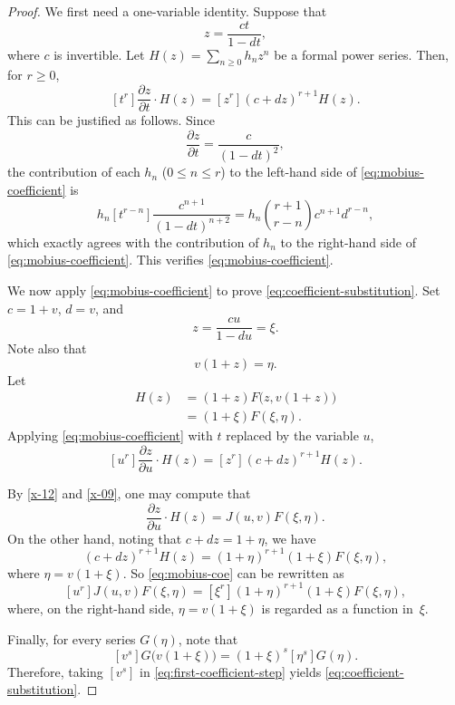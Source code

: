 \documentclass[10pt,a4paper]{amsart}
\begin{document}
\begin{proof}
We first need  a one-variable identity.  Suppose that
\[
 z=\frac{ct}{1-dt}, 
\]
where $c$ is invertible.  Let $H(z)=\sum_{n\geq0}h_nz^n$ be a formal power series.  Then, for
$r\geq0$,
\begin{equation}\label{eq:mobius-coefficient}
 [t^r]\frac{\partial z}{\partial t}\cdot H(z)
 =[z^r](c+dz)^{r+1}H(z).
\end{equation}
This can be justified as follows.  Since
\[
 \frac{\partial z}{\partial t}=\frac{c}{(1-dt)^2},
\]
the contribution of each $h_n$ ($0\leq n\leq r$) to the left-hand side of \eqref{eq:mobius-coefficient} is
\[
 h_n[t^{r-n}]\frac{c^{n+1}}{(1-dt)^{n+2}}
 =h_n\binom{r+1}{r-n}c^{n+1}d^{r-n},
\]
which exactly agrees with the  contribution of $h_n$ to the right-hand side  of \eqref{eq:mobius-coefficient}. 
This verifies \eqref{eq:mobius-coefficient}. 

We now apply \eqref{eq:mobius-coefficient} to prove \eqref{eq:coefficient-substitution}.
Set  $c=1+v$, $d=v$, and 
\begin{equation}\label{x-12}
     z=\frac{cu}{1-du}=\xi.
\end{equation}
Note also that 
\[
v(1+z)=\eta.
\] 
Let 
\begin{align}
     H(z)&=(1+z)F\bigl(z,v(1+z)\bigr)\nonumber\\
     &=(1+\xi)F(\xi, \eta).\label{x-09}
\end{align}
Applying 
\eqref{eq:mobius-coefficient} with $t$ replaced by the variable $u$,
\begin{equation}\label{eq:mobius-coe}
 [u^r]\frac{\partial z}{\partial u}\cdot H(z)
 =[z^r](c+dz)^{r+1}H(z).
\end{equation}

By \eqref{x-12} and \eqref{x-09}, one may compute that 
\begin{equation*}
  \frac{\partial z}{\partial u}\cdot H(z)=J(u,v) F(\xi,\eta).  
\end{equation*}
On the other hand, noting that 
  $c+dz=1+\eta$, we have
\begin{equation*}
    (c+dz)^{r+1}H(z)=(1+\eta)^{r+1}(1+\xi)F(\xi,\eta),
\end{equation*}  
{where $\eta=v(1+\xi)$}. 
So \eqref{eq:mobius-coe} can be rewritten as 
\begin{equation}\label{eq:first-coefficient-step}
 [u^r]J(u,v)F(\xi,\eta)
 =[\xi^r](1+\eta)^{r+1}(1+\xi)F(\xi,\eta),
\end{equation}
where, on the right-hand side,  $\eta=v(1+\xi)$ is regarded as a function in~$\xi$. 


Finally, for every series $G(\eta)$, note that 
\[
 [v^s]G\bigl(v(1+\xi)\bigr)
 =(1+\xi)^s[\eta^s]G(\eta).
\]
Therefore, taking $[v^s]$ in \eqref{eq:first-coefficient-step}   yields \eqref{eq:coefficient-substitution}.
\end{proof}
\end{document}
